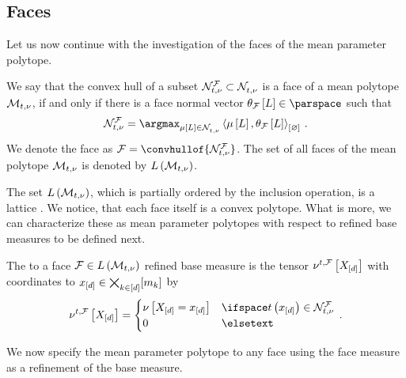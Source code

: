 
\subsection{Faces}

Let us now continue with the investigation of the faces of the mean parameter polytope. %

\begin{definition}
    We say that the convex hull of a subset $\mathcal{N}_{t,\nu}^{\mathcal{F}}\subset\mathcal{N}_{t,\nu}^{}$ is a face of a mean polytope $\mathcal{M}_{t,\nu}$, if and only if there is a face normal vector $\canparamofat{\facesymbol}{\selvariable}\in\parspace$ such that
    \begin{align*}
        \genfaceimset
        = \argmax_{\meanparamwith\in\genimset} \contraction{\meanparamwith,\canparamofat{\facesymbol}{\selvariable}} \, .
    \end{align*}
    We denote the face as $\facesymbol=\convhullof{\genfaceimset}$.
    The set of all faces of the mean polytope $\mathcal{M}_{t,\nu}$ is denoted by $L\left(\mathcal{M}_{t,\nu}\right)$.
\end{definition}

The set $L\left(\mathcal{M}_{t,\nu}\right)$, which is partially ordered by the inclusion operation, is a lattice \cite{ziegler_lectures_2013}.
We notice, that each face itself is a convex polytope.
What is more, we can characterize these as mean parameter polytopes with respect to refined base measures to be defined next.

\begin{definition}
    \label{def:faceMeasure}
    The to a face $\mathcal{F}\in L\left(\mathcal{M}_{t,\nu}\right)$ refined base measure is the tensor $\nu^{t,\mathcal{F}}\left[X_{[d]}\right]$ with coordinates to $x_{[d]}\in\bigtimes_{k\in[d]}[m_{k}]$ by
    \begin{align*}
        \genfacemeasurewith
        = \begin{cases}
              \basemeasureat{\indexedshortcatvariables} & \ifspace \sstatat{\shortcatindices}\in\genfaceimset \\
              0 & \elsetext
        \end{cases} \, .
    \end{align*}
\end{definition}

We now specify the mean parameter polytope to any face using the face measure as a refinement of the base measure.

